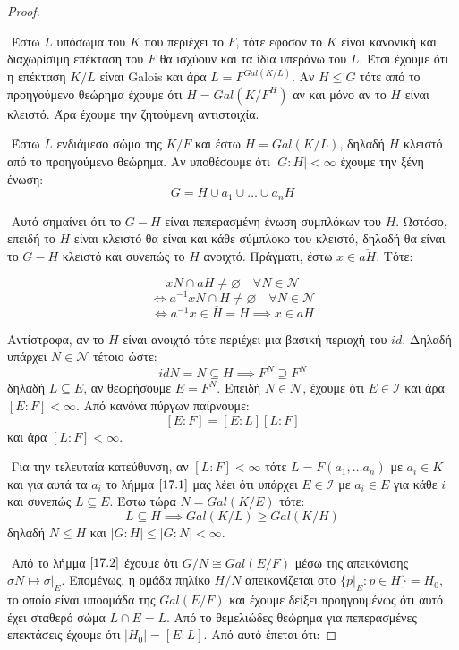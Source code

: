 \documentclass[oneside,a4paper]{article}
\newcommand {\tl}{\textlatin}
\begin{document}
\begin{proof} $ $


$ $\newline	
Έστω $L$ υπόσωμα του $K$ που περιέχει το $F$, τότε εφόσον το $K$ είναι κανονική και διαχωρίσιμη επέκταση του $F$ θα ισχύουν και τα ίδια υπεράνω του $L$. Έτσι έχουμε ότι η επέκταση $K/L$ είναι \tl{Galois} και άρα $L = F^{Gal(K/L)}$. Αν $H \leq G$ τότε από το προηγούμενο θεώρημα έχουμε ότι $H=Gal(K/F^H)$  αν και μόνο αν το $H$ είναι κλειστό. Άρα έχουμε την ζητούμενη αντιστοιχία.

$ $\newline
Έστω $L$ ενδιάμεσο σώμα της $K/F$ και έστω $H = Gal(K/L)$, δηλαδή $H$ κλειστό από το προηγούμενο θεώρημα. Αν υποθέσουμε ότι $|G : H| < \infty$ έχουμε την ξένη ένωση:
$$G = H \cup a_1 \cup \ldots \cup a_n H$$

$ $\newline
Αυτό σημαίνει ότι το $G-H$ είναι πεπερασμένη ένωση συμπλόκων του $H$. Ωστόσο, επειδή το $H$ είναι κλειστό θα είναι και κάθε σύμπλοκο του κλειστό, δηλαδή θα είναι το $G-H$ κλειστό και συνεπώς το $H$ ανοιχτό.
Πράγματι, έστω $x \in \overline{aH}$. Τότε:

$$xN\cap aH \neq \varnothing \quad \forall N \in \mathcal N$$
$$\iff a^{-1} x N \cap H \neq \varnothing \quad\forall N \in \mathcal N$$
$$\iff a^{-1} x \in \overline H = H \implies x\in aH$$

Αντίστροφα, αν το $H$ είναι ανοιχτό τότε περιέχει μια βασική περιοχή του $id$. Δηλαδή υπάρχει $N \in \mathcal{N}$ τέτοιο ώστε:
$$id N = N \subseteq H \implies F^N \supseteq F^N$$
δηλαδή $L \subseteq E$, αν θεωρήσουμε $E = F^N$. Επειδή $N \in \mathcal N$, έχουμε ότι $E \in \mathcal I$ και άρα $[E:F] < \infty$. Από κανόνα πύργων παίρνουμε:
$$[E:F]=[E:L][L:F]$$
και άρα $[L:F] < \infty$.

$ $\newline
Για την τελευταία κατεύθυνση, αν $[L:F] <\infty$ τότε $L=F(a_1,\ldots a_n)$ με $a_i \in K$ και για αυτά τα $a_i$ το λήμμα $\ref{17.1}$ μας λέει ότι υπάρχει $E \in \mathcal{I}$ με $a_i \in E$ για κάθε $i$ και συνεπώς $L \subseteq E$. Έστω τώρα $N = Gal(K/E)$ τότε:
$$L \subseteq H \implies Gal(K/L) \geq Gal(K/H)$$
δηλαδή $N \leq H$ και $| G:H| \leq |G:N| < \infty$.

$ $\newline
Από το λήμμα $\ref{17.2}$ έχουμε ότι $G/N \cong Gal(E/F)$ μέσω της απεικόνισης $\sigma N \mapsto \sigma|_E$. Επομένως, η ομάδα πηλίκο $H/N$ απεικονίζεται στο $\{p|_E : p \in H\}=H_0$, το οποίο είναι υποομάδα της $Gal(E/F)$ και έχουμε δείξει προηγουμένως ότι αυτό έχει σταθερό σώμα $L \cap E = L$. Από το θεμελιώδες θεώρημα για πεπερασμένες επεκτάσεις έχουμε ότι $|H_0 | = [E:L]$. Από αυτό έπεται ότι:


\end{proof}
\end{document}
